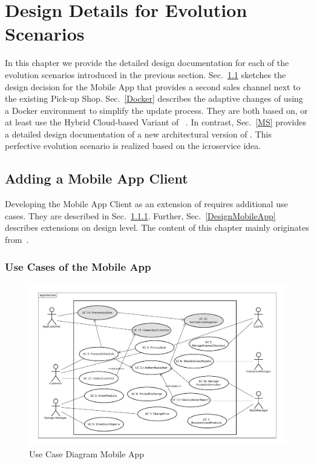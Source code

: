 
\chapter{Design Details for Evolution Scenarios}
\label{c:design}
In this chapter we provide the detailed design documentation for each of the evolution scenarios introduced in the previous section. 
Sec.~\ref{App} sketches the design decision for the Mobile App that provides a second sales channel next to the existing Pick-up Shop. Sec.~\ref{Docker} describes the adaptive changes of using a Docker environment to simplify the update process. They are both based on, or at least use the Hybrid Cloud-based Variant of \CoCoME~\cite{HeinrichRostamiReussner2016_1000052688}. In contrast, Sec.~\ref{MS} provides a detailed design documentation of a new architectural version of \CoCoME. This perfective evolution scenario is realized based on the icroservice idea.

\section{Adding a Mobile App Client} 
\label{App}
Developing the Mobile App Client as an extension of \CoCoME requires additional use cases. They are described in Sec.~\ref{UseCasesMobileApp}. Further, Sec.~\ref{DesignMobileApp} describes extensions on design level. The content of this chapter mainly originates from~\cite{schnabel}.

\subsection{Use Cases of the Mobile App}
\label{UseCasesMobileApp}
\begin{figure}[t]
	\includegraphics[width=\textwidth]{img/appUseCase.pdf}
	\caption{Use Case Diagram \CoCoME Mobile App}
\end{figure}

